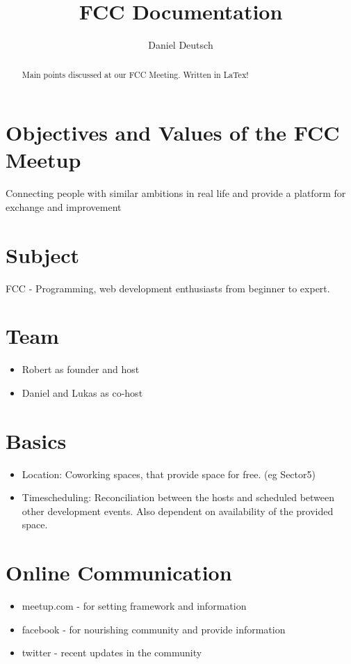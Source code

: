 \documentclass[a4paper]{article}
\title{FCC Documentation}
\author{Daniel Deutsch}
\begin{document}
\maketitle

\begin{abstract}
Main points discussed at our FCC Meeting. Written in LaTex!
\end{abstract}

\section{Objectives and Values of the FCC Meetup}
Connecting people with similar ambitions in real life and provide a platform for exchange and improvement


\section{Subject}
FCC - Programming, web development enthusiasts from beginner to expert.

\section{Team}
\begin{itemize}
\item Robert as founder and host
\item Daniel and Lukas as co-host
\end{itemize}

\section{Basics}
\begin{itemize}
\item Location: Coworking spaces, that provide space for free. (eg Sector5)
\item Timescheduling: Reconciliation between the hosts and scheduled between other development events. Also dependent on availability of the provided space.
\end{itemize}

\section{Online Communication}
\begin{itemize}
\item meetup.com - for setting framework and information
\item facebook - for nourishing community and provide information
\item twitter - recent updates in the community
\end{itemize}
\end{document}

